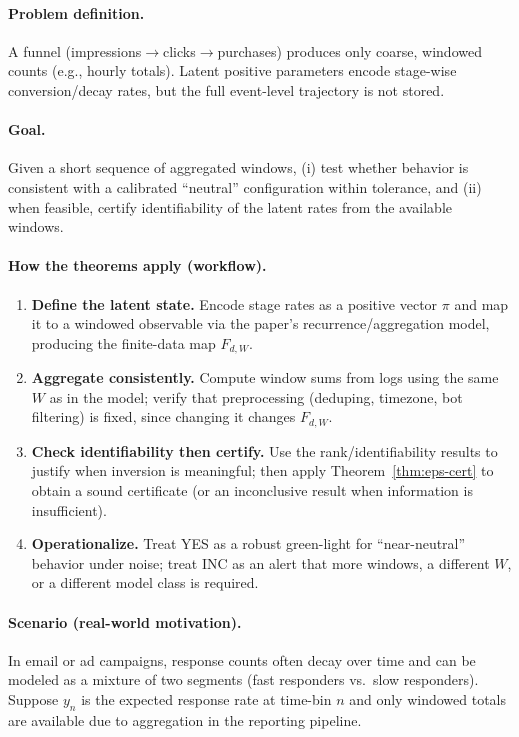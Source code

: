 \documentclass[11pt,reqno]{amsart}
\theoremstyle{definition}
\theoremstyle{remark}
\newcommand{\1}{\mathbf{1}}
\begin{document}
\paragraph{Problem definition.}
A funnel (impressions$\to$clicks$\to$purchases) produces only coarse, windowed counts (e.g., hourly totals). Latent positive parameters encode stage-wise conversion/decay rates, but the full event-level trajectory is not stored.

\paragraph{Goal.}
Given a short sequence of aggregated windows, (i) test whether behavior is consistent with a calibrated ``neutral'' configuration within tolerance, and (ii) when feasible, certify identifiability of the latent rates from the available windows.

\paragraph{How the theorems apply (workflow).}
\begin{enumerate}
\item \textbf{Define the latent state.} Encode stage rates as a positive vector $\pi$ and map it to a windowed observable via the paper's recurrence/aggregation model, producing the finite-data map $F_{d,W}$.
\item \textbf{Aggregate consistently.} Compute window sums from logs using the same $W$ as in the model; verify that preprocessing (deduping, timezone, bot filtering) is fixed, since changing it changes $F_{d,W}$.
\item \textbf{Check identifiability then certify.} Use the rank/identifiability results to justify when inversion is meaningful; then apply Theorem~\ref{thm:eps-cert} to obtain a sound certificate (or an inconclusive result when information is insufficient).
\item \textbf{Operationalize.} Treat \textsf{YES} as a robust green-light for ``near-neutral'' behavior under noise; treat \textsf{INC} as an alert that more windows, a different $W$, or a different model class is required.
\end{enumerate}

\paragraph{Scenario (real-world motivation).}
In email or ad campaigns, response counts often decay over time and can be modeled as a mixture of two segments (fast responders vs.\ slow responders).
Suppose $y_n$ is the expected response rate at time-bin $n$ and only windowed totals are available due to aggregation in the reporting pipeline.
\end{document}
